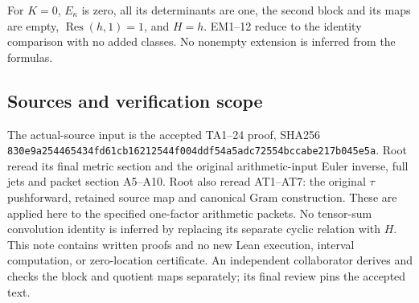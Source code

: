 For \(K=0\), \(E_\kappa\) is zero, all its determinants are one, the second
block and its maps are empty, \(\operatorname{Res}(h,1)=1\), and \(H=h\). EM1--12 reduce to
the identity comparison with no added classes. No nonempty extension
is inferred from the formulas.

\subsection{Sources and verification scope}\label{EM-sources-and-verification-scope}

The actual-source input is the accepted TA1--24 proof, SHA256
\nolinkurl{830e9a254465434fd61cb16212544f004ddf54a5adc72554bccabe217b045e5a}.
Root reread its final metric section and the original arithmetic-input
Euler inverse, full jets and packet section A5--A10. Root also reread
AT1--AT7: the original \(\tau\) pushforward, retained source map and canonical
Gram construction. These are applied here to the specified one-factor
arithmetic packets. No tensor-sum convolution identity is inferred by
replacing its separate cyclic relation with \(H\). This note contains written
proofs and no new Lean execution, interval computation, or zero-location
certificate. An independent collaborator derives and checks the block
and quotient maps separately; its final review pins the accepted text.
